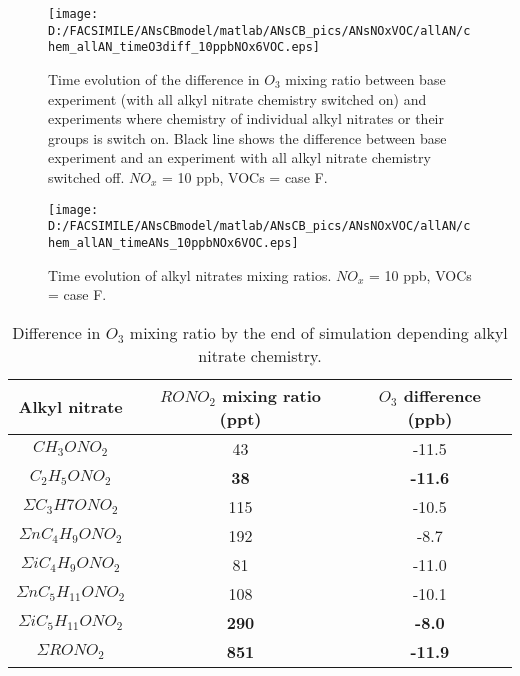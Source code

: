 \documentclass[11pt,a4paper]{article}
\begin{document}
\begin{figure}
\centering
\texttt{[image: D:/FACSIMILE/ANsCBmodel/matlab/ANsCB\_pics/ANsNOxVOC/allAN/chem\_allAN\_timeO3diff\_10ppbNOx6VOC.eps]}
\caption{Time evolution of the difference in $O_3$ mixing ratio between base experiment (with all alkyl nitrate chemistry switched on) and experiments where chemistry of individual alkyl nitrates or their groups is switch on. Black line shows the difference between base experiment and an experiment with all alkyl nitrate chemistry switched off. $NO_x$ = 10 ppb, VOCs = case F.}\label{fig:timeO3diff10ppbNOx6VOC}
\end{figure}
\begin{figure}
\centering
\texttt{[image: D:/FACSIMILE/ANsCBmodel/matlab/ANsCB\_pics/ANsNOxVOC/allAN/chem\_allAN\_timeANs\_10ppbNOx6VOC.eps]}
\caption{Time evolution of alkyl nitrates mixing ratios. $NO_x$ = 10 ppb, VOCs = case F.}\label{fig:timeANs10ppbNOx6VOC}
\end{figure}
\begin{table}
\caption{Difference in $O_3$ mixing ratio by the end of simulation depending alkyl nitrate chemistry.}\label{tab:timeO3diffANs10ppbNOx6VOC}
\centering
\begin{tabular}{ccc}
\hline
Alkyl nitrate            & $RONO_2$ mixing ratio (ppt) & $O_3$ difference (ppb) \\
\hline
$CH_3ONO_2$              & 43  & -11.5 \\
$C_2H_5ONO_2$            & \textbf{38}  & \textbf{-11.6} \\
$\Sigma C_3H7ONO_2$      & 115 & -10.5 \\
$\Sigma nC_4H_9ONO_2$    & 192 & -8.7  \\
$\Sigma iC_4H_9ONO_2$    & 81  & -11.0 \\
$\Sigma nC_5H_{11}ONO_2$ & 108 & -10.1 \\
$\Sigma iC_5H_{11}ONO_2$ & \textbf{290} & \textbf{-8.0}  \\
\textbf{$\Sigma RONO_2$} & \textbf{851} & \textbf{-11.9} \\
\hline
\end{tabular}
\end{table}
\end{document}
